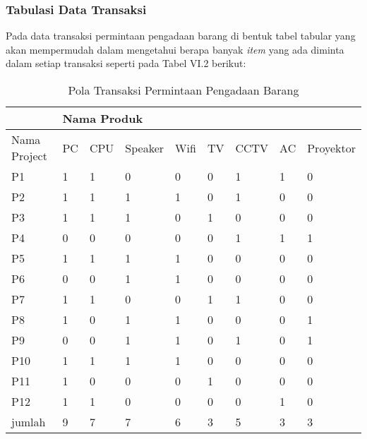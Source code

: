 \pagebreak
\subsubsection{Tabulasi Data Transaksi}
Pada data transaksi permintaan pengadaan barang di bentuk tabel tabular yang akan mempermudah dalam mengetahui berapa banyak \textit{item} yang ada diminta dalam setiap transaksi seperti pada Tabel VI.2 berikut:
\begin{table}[!h]
\caption{Pola Transaksi Permintaan Pengadaan Barang}
\begin{center}
\begin{tabular}{|l|l|l|l|l|l|l|l|l|}
\hline
             & \multicolumn{8}{l|}{Nama Produk}                       \\ \hline
Nama Project & PC & CPU & Speaker & Wifi & TV & CCTV & AC & Proyektor \\ \hline
P1           & 1  & 1   & 0       & 0    & 0  & 1    & 1  & 0         \\ \hline
P2           & 1  & 1   & 1       & 1    & 0  & 1    & 0  & 0         \\ \hline
P3           & 1  & 1   & 1       & 0    & 1  & 0    & 0  & 0         \\ \hline
P4           & 0  & 0   & 0       & 0    & 0  & 1    & 1  & 1         \\ \hline
P5           & 1  & 1   & 1       & 1    & 0  & 0    & 0  & 0         \\ \hline
P6           & 0  & 0   & 1       & 1    & 0  & 0    & 0  & 0         \\ \hline
P7           & 1  & 1   & 0       & 0    & 1  & 1    & 0  & 0         \\ \hline
P8           & 1  & 0   & 1       & 1    & 0  & 0    & 0  & 1         \\ \hline
P9           & 0  & 0   & 1       & 1    & 0  & 1    & 0  & 1         \\ \hline
P10          & 1  & 1   & 1       & 1    & 0  & 0    & 0  & 0         \\ \hline
P11          & 1  & 0   & 0       & 0    & 1  & 0    & 0  & 0         \\ \hline
P12          & 1  & 1   & 0       & 0    & 0  & 0    & 1  & 0         \\ \hline
jumlah       & 9  & 7   & 7       & 6    & 3  & 5    & 3  & 3         \\ \hline
\end{tabular}
\end{center}
\end{table}

